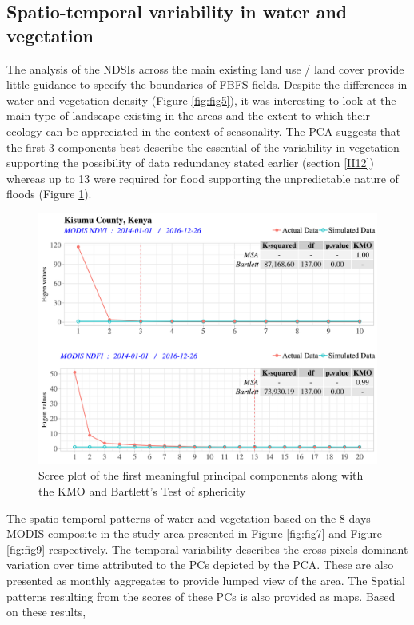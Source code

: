 \documentclass[12pt,oneside]{article}
\begin{document}
\hypertarget{II3}{%
\subsection{Spatio-temporal variability in water and vegetation}\label{II3}}

The analysis of the NDSIs across the main existing land use / land cover provide little guidance to specify the boundaries of FBFS fields. Despite the differences in water and vegetation density (Figure \ref{fig:fig5}), it was interesting to look at the main type of landscape existing in the areas and the extent to which their ecology can be appreciated in the context of seasonality. The PCA suggests that the first 3 components best describe the essential of the variability in vegetation supporting the possibility of data redundancy stated earlier (section \ref{II12}) whereas up to 13 were required for flood supporting the unpredictable nature of floods (Figure \ref{fig:fig6}).

\begin{figure}
\includegraphics[width=1\linewidth]{figures/Mapping_FBFS_NDVI_NDFI_parallel_analysis_sreeplot} \caption{Scree plot of the first meaningful principal components along with the KMO and Bartlett's Test of sphericity}\label{fig:fig6}
\end{figure}

The spatio-temporal patterns of water and vegetation based on the 8 days MODIS composite in the study area presented in Figure \ref{fig:fig7} and Figure \ref{fig:fig9} respectively. The temporal variability describes the cross-pixels dominant variation over time attributed to the PCs depicted by the PCA. These are also presented as monthly aggregates to provide lumped view of the area. The Spatial patterns resulting from the scores of these PCs is also provided as maps. Based on these results,
\end{document}
